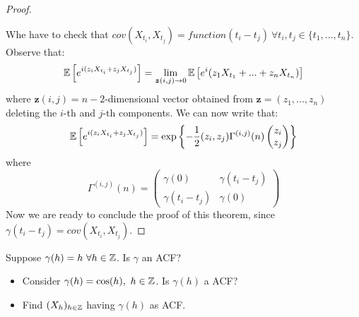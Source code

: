 \begin{proof}
\begin{itemize}
    \end{itemize}
    Whe have to check that $cov(X_{t_i},X_{t_j})=function(t_i-t_j)\ \forall t_i,t_j\in\{t_1,...,t_n\}$. Observe that:
    \[
        \mathbb{E}\left[e^{i(z_iX_{t_i}+z_jX_{t_j})}\right]=\lim_{\boldsymbol{z}(i,j)\to0}\mathbb{E}\left[e^i(z_1X_{t_1}+...+z_nX_{t_n})\right]  
    \]
    where $\boldsymbol{z}(i,j)=n-2$-dimensional vector obtained from $\boldsymbol{z}=(z_1,...,z_n)$ deleting the $i$-th and $j$-th components. We can now write that:
    \[
        \mathbb{E}\left[e^{i(z_iX_{t_i}+z_jX_{t_j})}\right]=\exp\left\{-\frac{1}{2}(z_i,z_j)\Gamma^{(i,j)}(n)\begin{pmatrix}z_i\\z_j\end{pmatrix}\right\}
    \]   
    where
    \[
        \Gamma^{(i,j)}(n)=
        \begin{pmatrix}
            \gamma(0)&\gamma(t_i-t_j)\\
            \gamma(t_i-t_j)&\gamma(0)
        \end{pmatrix}
    \]  
    Now we are ready to conclude the proof of this theorem, since $\gamma(t_i-t_j)=cov(X_{t_i}, X_{t_j})$.
\end{proof}

\begin{exercise}
    Suppose $\gamma(h)=h\ \forall h\in\mathbb{Z}$. Is $\gamma$ an ACF?
\end{exercise}

\begin{exercise}
    \text{}
    \begin{itemize}
        \item Consider $\gamma(h)=\cos(h),\ h\in\Z$. Is $\gamma(h)$ a ACF?
        \item Find $(X_h)_{h\in\mathbb{Z}}$ having $\gamma(h)$ as ACF.
    \end{itemize}
\end{exercise}
